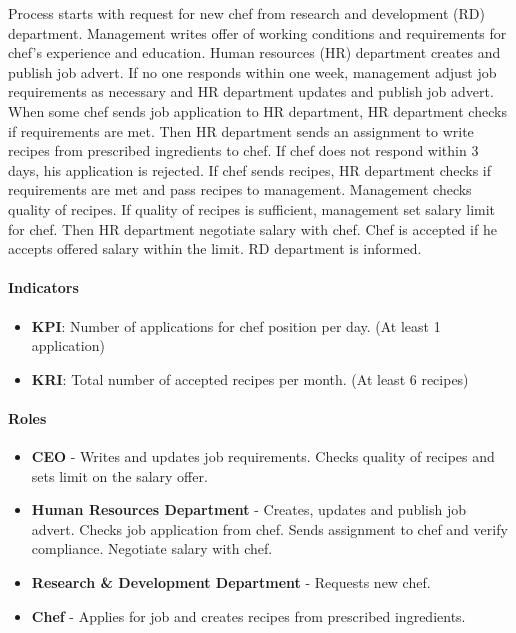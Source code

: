 \documentclass[11pt,a4paper]{article}
\begin{document}
Process starts with request for new chef from research and development (RD) department. Management writes offer of working conditions and requirements for chef's experience and education. Human resources (HR) department creates and publish job advert. If no one responds within one week, management adjust job requirements as necessary and HR department updates and publish job advert. When some chef sends job application to HR department, HR department checks if requirements are met. Then HR department sends an assignment to write recipes from prescribed ingredients to chef. If chef does not respond within 3 days, his application is rejected. If chef sends recipes, HR department checks if requirements are met and pass recipes to management. Management checks quality of recipes. If quality of recipes is sufficient, management set salary limit for chef. Then HR department negotiate salary with chef. Chef is accepted if he accepts offered salary within the limit. RD department is informed.

\paragraph{Indicators}

\begin{itemize}
    \item \textbf{KPI}: Number of applications for chef position per day. (At least 1 application)
    \item \textbf{KRI}: Total number of accepted recipes per month. (At least 6 recipes)
\end{itemize}

\paragraph{Roles}

\begin{itemize}
    \item \textbf{CEO} - Writes and updates job requirements. Checks quality of recipes and sets limit on the salary offer.
    \item \textbf{Human Resources Department} - Creates, updates and publish job advert. Checks job application from chef. Sends assignment to chef and verify compliance. Negotiate salary with chef.
    \item \textbf{Research \& Development Department} - Requests new chef.
    \item \textbf{Chef} - Applies for job and creates recipes from prescribed ingredients.
\end{itemize}
\end{document}
